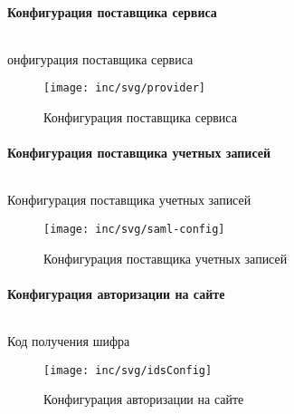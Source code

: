 \paragraph{Конфигурация поставщика сервиса}

\begin{longlisting}
\inputminted[linenos,frame=single]{xml}{inc/src/samlProviderConfiguration}
\caption{онфигурация поставщика сервиса} 
\label{lst:samlProviderConfiguration}
\end{longlisting}

\begin{figure}[H]
  \centering
  \texttt{[image: inc/svg/provider]}
  \caption{Конфигурация поставщика сервиса}
  \label{fig:runConfig}
\end{figure}

\paragraph{Конфигурация поставщика учетных записей}

\begin{longlisting}
\inputminted[linenos,frame=single]{xml}{inc/src/samlConfiguration}
\caption{Конфигурация поставщика учетных записей} 
\label{lst:samlConfiguration}
\end{longlisting}

\begin{figure}[H]
  \centering
  \texttt{[image: inc/svg/saml-config]}
  \caption{Конфигурация поставщика учетных записей}
  \label{fig:samlConfig}
\end{figure}

\paragraph{Конфигурация авторизации на сайте}

\begin{longlisting}[H]
\inputminted[linenos,frame=single]{xml}{inc/src/idsConfiguration}
\caption{Код получения шифра} 
\label{lst:idsConfiguration}
\end{longlisting}

\begin{figure}[H]
  \centering
  \texttt{[image: inc/svg/idsConfig]}
  \caption{Конфигурация авторизации на сайте}
  \label{fig:idsConfig}
\end{figure}


